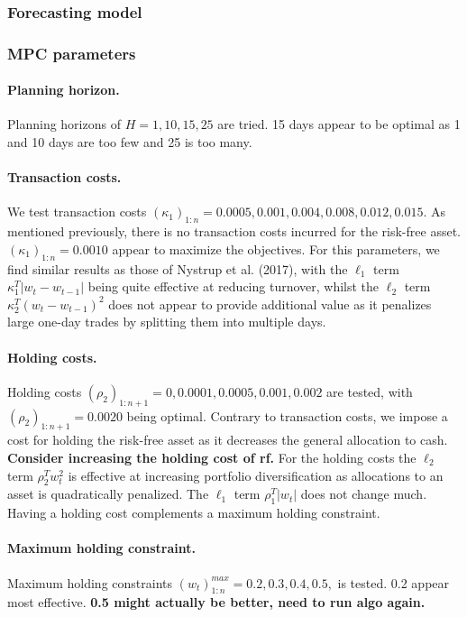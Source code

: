\subsubsection*{Forecasting model}

\subsubsection*{MPC parameters}

\paragraph{\textbf{Planning horizon.}} Planning horizons of $H=1,10,15,25$ are tried. 15 days appear to be optimal as 1 and 10 days are too few and 25 is too many.

\paragraph{\textbf{Transaction costs.}} We test transaction costs $(\kappa_1)_{1:n}=0.0005, 0.001, 0.004, 0.008, 0.012, 0.015$. As mentioned previously, there is no transaction costs incurred for the risk-free asset. $(\kappa_1)_{1:n}=0.0010$ appear to maximize the objectives. For this parameters, we find similar results as those of Nystrup et al. (2017), with the $\ell_1$ term $\kappa_1^T|w_t-w_{t-1}|$ being quite effective at reducing turnover, whilst the $\ell_2$ term $\kappa_2^T(w_t-w_{t-1})^2$ does not appear to provide additional value as it penalizes large one-day trades by splitting them into multiple days.

\paragraph{\textbf{Holding costs.}} Holding costs $(\rho_2)_{1:n+1}=0, 0.0001, 0.0005, 0.001, 0.002$ are tested, with $(\rho_2)_{1:n+1}=0.0020$ being optimal. Contrary to transaction costs, we impose a cost for holding the risk-free asset as it decreases the general allocation to cash. \textbf{Consider increasing the holding cost of rf.} For the holding costs the $\ell_2$ term $\rho_2^Tw_t^2$ is effective at increasing portfolio diversification as allocations to an asset is quadratically penalized. The $\ell_1$ term $\rho_1^T|w_t|$ does not change much. Having a holding cost complements a maximum holding constraint.

\paragraph{\textbf{Maximum holding constraint.}} Maximum holding constraints $(w_t)_{1:n}^{max}=0.2,0.3,0.4,0.5,$ is tested. 0.2 appear most effective. \textbf{0.5 might actually be better, need to run algo again.}


